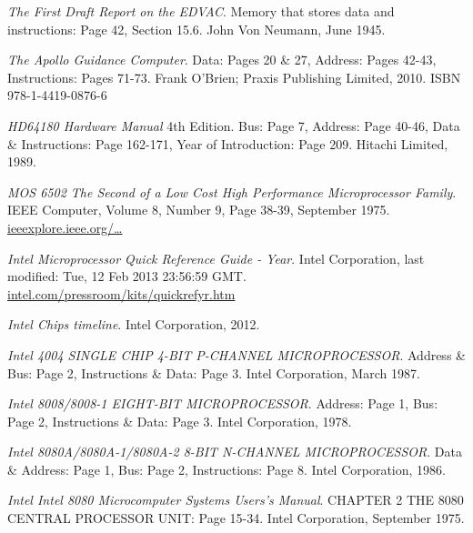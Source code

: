 \documentclass[twoside,twocolumn]{article}
\begin{document}

\begin{thebibliography}{99} %

\textit{The First Draft Report on the EDVAC}.
Memory that stores data and instructions: Page 42, Section 15.6.
John Von Neumann, June 1945.

\textit{The Apollo Guidance Computer}.
Data: Pages 20 \& 27, Address: Pages 42-43, Instructions: Pages 71-73.
Frank O'Brien; Praxis Publishing Limited, 2010.
ISBN 978-1-4419-0876-6

\textit{HD64180 Hardware Manual} 4th Edition.
Bus: Page 7, Address: Page 40-46, Data \& Instructions: Page 162-171, Year of Introduction: Page 209.
Hitachi Limited, 1989.

\textit{MOS 6502 The Second of a Low Cost High Performance Microprocessor Family}.
IEEE Computer, Volume 8, Number 9, Page 38-39, September 1975.
\href{https://ieeexplore.ieee.org/stamp/stamp.jsp?tp=\&arnumber=1649550\&isnumber=34590}{ieeexplore.ieee.org/\ldots}

\textit{Intel Microprocessor Quick Reference Guide - Year}.
Intel Corporation, last modified: Tue, 12 Feb 2013 23:56:59 GMT.
\href{https://www.intel.com/pressroom/kits/quickrefyr.htm}{intel.com/pressroom/kits/quickrefyr.htm}

\textit{Intel Chips timeline}.
Intel Corporation, 2012.

\textit{Intel 4004 SINGLE CHIP 4-BIT P-CHANNEL MICROPROCESSOR}.
Address \& Bus: Page 2, Instructions \& Data: Page 3.
Intel Corporation, March 1987.

\textit{Intel 8008/8008-1 EIGHT-BIT MICROPROCESSOR}.
Address: Page 1, Bus: Page 2, Instructions \& Data: Page 3.
Intel Corporation, 1978.

\textit{Intel 8080A/8080A-1/8080A-2 8-BIT N-CHANNEL MICROPROCESSOR}.
Data \& Address: Page 1, Bus: Page 2, Instructions: Page 8.
Intel Corporation, 1986.

\textit{Intel Intel 8080 Microcomputer Systems Users's Manual}.
CHAPTER 2 THE 8080 CENTRAL PROCESSOR UNIT: Page 15-34.
Intel Corporation, September 1975.


\end{thebibliography}
\end{document}
